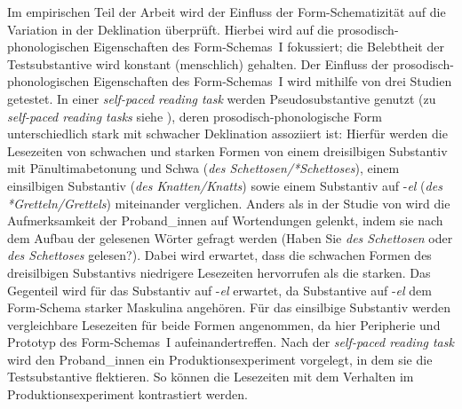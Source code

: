 \begin{sloppypar}
Im empirischen Teil der Arbeit wird der Einfluss der Form-Schematizität auf die Variation in der Deklination überprüft. Hierbei wird auf die prosodisch-pho\-no\-lo\-gi\-schen Eigenschaften des Form-Schemas~I fokussiert; die Belebtheit der Testsubstantive wird konstant (menschlich) gehalten. Der Einfluss der pro\-so\-disch-pho\-no\-lo\-gi\-schen Eigenschaften des Form-Schemas~I wird mithilfe von drei Studien getestet. In einer \textit{self-paced reading task} werden Pseudosubstantive genutzt (zu \textit{self-paced reading tasks} siehe ), deren pro\-so\-disch-pho\-no\-lo\-gi\-sche Form unterschiedlich stark mit schwacher Deklination assoziiert ist: Hierfür werden die Lesezeiten von schwachen und starken Formen von einem dreisilbigen Substantiv mit Pänultimabetonung und Schwa (\textit{des Schettosen/*Schet\-to\-ses}), einem einsilbigen Substantiv (\textit{des Knatten/Knatts}) sowie einem Substantiv auf -\textit{el} (\textit{des *Gretteln/Grettels}) miteinander verglichen. Anders als in der Studie von \textcite{Schmitt.2019} wird die Aufmerksamkeit der Proband\_innen auf Wortendungen gelenkt, indem sie nach dem Aufbau der gelesenen Wörter gefragt werden (Haben Sie \textit{des Schettosen} oder \textit{des Schettoses} gelesen?). Dabei wird erwartet, dass die schwachen Formen des dreisilbigen Substantivs niedrigere Lesezeiten hervorrufen als die starken. Das Gegenteil wird für das Substantiv auf -\textit{el} erwartet, da Substantive auf -\textit{el} dem Form-Schema starker Maskulina angehören. Für das einsilbige Substantiv werden vergleichbare Lesezeiten für beide Formen angenommen, da hier Peripherie und Prototyp des Form-Schemas~I aufeinandertreffen. Nach der \textit{self-paced reading task} wird den Proband\_innen ein Produktionsexperiment vorgelegt, in dem sie die Testsubstantive flektieren. So können die Lesezeiten mit dem Verhalten im Produktionsexperiment kontrastiert werden. 
\end{sloppypar}

